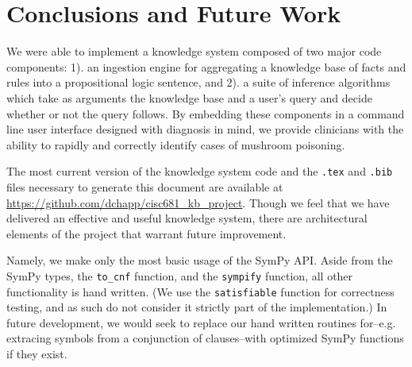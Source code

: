 \documentclass[12pt, conference, compsocconf]{IEEEtran}
\begin{document}
\section{Conclusions and Future Work}
We were able to implement a knowledge system composed of two major code components: 1). an ingestion engine for aggregating a knowledge base of facts and rules into a propositional logic sentence, and 2). a suite of inference algorithms which take as arguments the knowledge base and a user's query and decide whether or not the query follows. 
By embedding these components in a command line user interface designed with diagnosis in mind, we provide clinicians with the ability to rapidly and correctly identify cases of mushroom poisoning. 

The most current version of the knowledge system code and the \texttt{.tex} and \texttt{.bib} files necessary to generate this document are available at \url{https://github.com/dchapp/cisc681_kb_project}. 
Though we feel that we have delivered an effective and useful knowledge system, there are architectural elements of the project that warrant future improvement. 

Namely, we make only the most basic usage of the SymPy API. 
Aside from the SymPy types, the \texttt{to\_cnf} function, and the \texttt{sympify} function, all other functionality is hand written. 
(We use the \texttt{satisfiable} function for correctness testing, and as such do not consider it strictly part of the implementation.) 
In future development, we would seek to replace our hand written routines for--e.g. extracing symbols from a conjunction of clauses--with optimized SymPy functions if they exist. 





\end{document}
